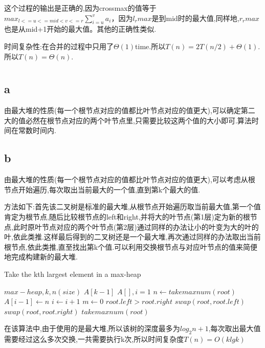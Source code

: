 \documentclass[12pt,a4paper]{ctexart}
\begin{document}
这个过程的输出是正确的,因为crossmax的值等于$max_{l<=u<=mid<v<=r}\sum_{i=u}^va_i$，因为$l_rmax$是到mid时的最大值,同样地,$r_rmax$也是从mid+1开始的最大值。其他的正确性类似.

时间复杂性:在合并的过程中只用了$\Theta(1)$time.所以$T(n)=2T(n/2)+\Theta(1)$.所以$T(n)=\Theta(n)$.
\section{}
\subsection{a}
由最大堆的性质(每一个根节点对应的值都比叶节点对应的值更大),可以确定第二大的值必然在根节点对应的两个叶节点里,只需要比较这两个值的大小即可.算法时间在常数时间内.
\subsection{b}
由最大堆的性质(每一个根节点对应的值都比叶节点对应的值更大),可以考虑从根节点开始遍历,每次取出当前最大的一个值,直到第k个最大的值.

方法如下:首先该二叉树是标准的最大堆,从根节点开始遍历取当前最大值,第一个值肯定为根节点,随后比较根节点的left和right,并将大的叶节点(第1层)定为新的根节点,此时原叶节点对应的两个叶节点(第2层)通过同样的办法让小的叶变为大的叶的叶,依此类推.这样最后得到的二叉树还是一个最大堆,再次通过同样的办法取出当前根节点,依此类推,直至找出第k个值.可以利用交换根节点与对应叶节点的值来简便地完成构建新的最大堆.

\begin{algorithm}
    \caption{Take the kth largest element in a max-heap}
    \label{alg1}
    \begin{algorithmic}
        \Require $max-heap,k,n(size)$
        \Ensure $A[k-1]$
        \State $A[],i=1$
        \State $n\gets takemaxnum(root)$
        \State $A[i-1]\gets n$
        \State $i\gets i+1$
        \EndWhile
        \State $m\gets 0$
        \If $root.left>root.right$
        \State $swap(root,root.left)$
        \Else $swap(root,root.right)$
        \EndIf
        \EndWhile
        \State \Return $takemaxnum(root)$
        \EndFunction
    \end{algorithmic}
\end{algorithm}

在该算法中,由于使用的是最大堆,所以该树的深度最多为$log_2n+1$,每次取出最大值需要经过这么多次交换,一共需要执行k次,所以时间复杂度$T(n)=O(klgk)$
\end{document}
